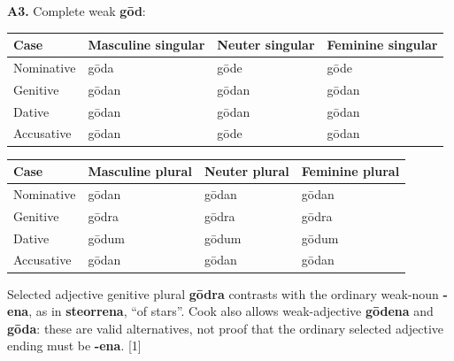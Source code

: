 \par\begin{minipage}{\linewidth}\raggedright
\textbf{A3.} Complete weak \textbf{gōd}:

\par\begingroup
\fontsize{10.5}{13.2}\selectfont
\setlength{\LTleft}{0pt}\setlength{\LTright}{\fill}
\noindent
\begin{tabular}{@{}>{\raggedright\arraybackslash}p{22.0mm}>{\raggedright\arraybackslash}p{31.188mm}>{\raggedright\arraybackslash}p{31.188mm}>{\raggedright\arraybackslash}p{31.188mm}@{}}
\toprule
\textbf{Case} & \textbf{Masculine singular} & \textbf{Neuter singular} & \textbf{Feminine singular} \\
\midrule
Nominative & gōda & gōde & gōde \\
Genitive & gōdan & gōdan & gōdan \\
Dative & gōdan & gōdan & gōdan \\
Accusative & gōdan & gōde & gōdan \\
\bottomrule
\end{tabular}
\par\endgroup
\par\addvspace{5pt}
\par\begingroup
\fontsize{10.5}{13.2}\selectfont
\setlength{\LTleft}{0pt}\setlength{\LTright}{\fill}
\noindent
\begin{tabular}{@{}>{\raggedright\arraybackslash}p{22.0mm}>{\raggedright\arraybackslash}p{31.188mm}>{\raggedright\arraybackslash}p{31.188mm}>{\raggedright\arraybackslash}p{31.188mm}@{}}
\toprule
\textbf{Case} & \textbf{Masculine plural} & \textbf{Neuter plural} & \textbf{Feminine plural} \\
\midrule
Nominative & gōdan & gōdan & gōdan \\
Genitive & gōdra & gōdra & gōdra \\
Dative & gōdum & gōdum & gōdum \\
Accusative & gōdan & gōdan & gōdan \\
\bottomrule
\end{tabular}
\par\endgroup
Selected adjective genitive plural \textbf{gōdra} contrasts with the ordinary weak-noun \textbf{-ena}, as in \textbf{steorrena}, “of stars”. Cook also allows weak-adjective \textbf{gōdena} and \textbf{gōda}: these are valid alternatives, not proof that the ordinary selected adjective ending must be \textbf{-ena}. [1]

\end{minipage}\par\addvspace{4pt}

